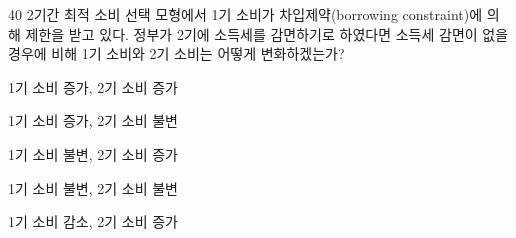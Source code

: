 \begin{question}{40}
2기간 최적 소비 선택 모형에서 1기 소비가 차입제약(borrowing constraint)에 의해 제한을 받고 있다. 정부가 2기에 소득세를 감면하기로 하였다면 소득세 감면이 없을 경우에 비해 1기 소비와 2기 소비는 어떻게 변화하겠는가?
\begin{choices}
  \item 1기 소비 증가, 2기 소비 증가
  \item 1기 소비 증가, 2기 소비 불변
  \item 1기 소비 불변, 2기 소비 증가
  \item 1기 소비 불변, 2기 소비 불변
  \item 1기 소비 감소, 2기 소비 증가
\end{choices}
\end{question}
